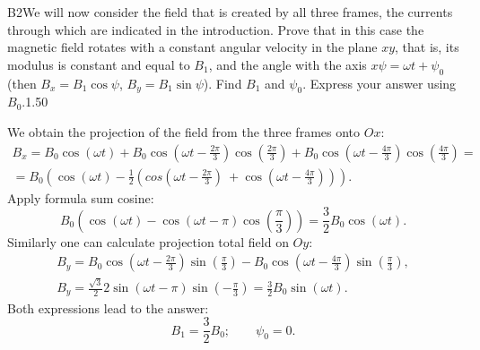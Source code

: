 \documentclass[11pt,a4paper]{article}
\begin{document}
\begin{solcard}{B2}{We will now consider the field that is created by all three frames, the currents through which are indicated in the introduction. Prove that in this case the magnetic field rotates with a constant angular velocity in the plane $xy$, that is, its modulus is constant and equal to $B_1$, and the angle with the axis $x\psi = \omega t + \psi_0$ (then $B_x = B_ 1 \cos \psi$, $B_y = B_1 \sin \psi$). Find $B_1$ and $\psi_0$. Express your answer using $B_0$.}{1.50}

We obtain the projection of the field from the three frames onto $Ox$: $$\begin{aligned} B_x = B_0\cos(\omega t) + B_0\cos\left(\omega t - \frac{2\pi}{3}\right)\cos\left(\frac{2\pi}{3}\right) + B_0\cos\left(\omega t - \frac{4\pi}{3}\right)\cos\left(\frac{4\pi}{3}\right) = \\
 = B_0\left( \cos(\omega t) - \frac{1}{2}\left(cos\left(\omega t - \frac{2\pi}{3}\right)\ + \cos\left(\omega t - \frac{4\pi}{3}\right)\right)\right). \end{aligned}$$ Apply formula sum cosine: $$ B_0\left( \cos(\omega t) - \cos\left(\omega t -\pi\right) \cos\left(\frac{\pi}{3}\right)\right) = \frac{3}{2}B_0\cos(\omega t). $$ Similarly one can calculate projection total field on $Oy$: $$\begin{aligned} B_y = B_0\cos\left(\omega t - \frac{2\pi}{3}\right)\sin\left(\frac{\pi}{3}\right) - B_0\cos\left(\omega t - \frac{4\pi}{3}\right)\sin\left(\frac{\pi}{3}\right), \\
 B_y = \frac{\sqrt{3}}{2}2\sin(\omega t - \pi)\sin\left(-\frac{\pi}{3}\right) = \frac{3}{2}B_0\sin(\omega t). \end{aligned}$$ Both expressions lead to the answer: $$ B_1 = \frac{3}{2}B_0; \qquad \psi_0 = 0. $$



\end{solcard}
\end{document}
